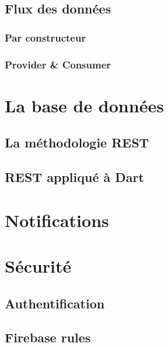     \subsection{Flux des données}

        \subsubsection{Par constructeur}

        \subsubsection{Provider \& Consumer}


    \section{La base de données}
        \subsection{La méthodologie REST}
        \subsection{REST appliqué à Dart}

            
    \section{Notifications}


    
    \section{Sécurité}

        \subsection{Authentification}

        \subsection{Firebase rules}
